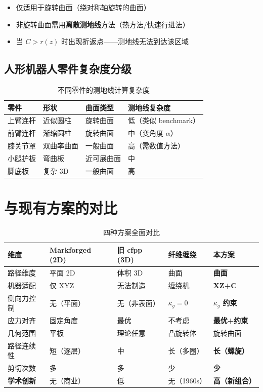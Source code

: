 \documentclass[11pt,a4paper]{article}
\begin{document}
\begin{itemize}[nosep]
\item 仅适用于旋转曲面（绕对称轴旋转的曲面）
\item 非旋转曲面需用\textbf{离散测地线}方法（热方法/快速行进法）
\item 当 $C > r(z)$ 时出现折返点——测地线无法到达该区域
\end{itemize}

\subsection{人形机器人零件复杂度分级}

\begin{table}[H]
\centering
\begin{tabularx}{\textwidth}{l l l X}
\toprule
\textbf{零件} & \textbf{形状} & \textbf{曲面类型} & \textbf{测地线复杂度} \\
\midrule
上臂连杆 & 近似圆柱 & 旋转曲面 & 低（类似 benchmark） \\
前臂连杆 & 渐缩圆柱 & 旋转曲面 & 中（变角度 $\alpha$） \\
膝关节罩 & 双曲率曲面 & 一般曲面 & 高（需数值方法） \\
小腿护板 & 弯曲板 & 近可展曲面 & 中 \\
脚底板 & 复杂 3D & 一般曲面 & 高 \\
\bottomrule
\end{tabularx}
\caption{不同零件的测地线计算复杂度}
\end{table}


\section{与现有方案的对比}

\begin{table}[H]
\centering
\small
\begin{tabularx}{\textwidth}{l X X X X}
\toprule
\textbf{维度} & \textbf{Markforged} (2D) & \textbf{旧 cfpp} (3D) & \textbf{纤维缠绕} & \textbf{本方案} \\
\midrule
路径维度 & 平面 2D & 体积 3D & 曲面 & \textcolor{pass}{\textbf{曲面}} \\
机器适配 & 仅 XYZ & 无法制造 & 缠绕机 & \textcolor{pass}{\textbf{XZ+C}} \\
侧向力控制 & 无（平面） & 无（非表面） & $\kappa_g=0$ & \textcolor{pass}{\textbf{$\kappa_g$ 约束}} \\
应力对齐 & 固定角度 & 最优 & 不考虑 & \textcolor{pass}{\textbf{最优+约束}} \\
几何范围 & 平板 & 理论任意 & 凸旋转体 & 旋转曲面 \\
路径连续性 & 短（逐层） & 中 & 长（多圈） & \textcolor{pass}{\textbf{长（螺旋）}} \\
剪切次数 & 多 & 多 & 少 & \textcolor{pass}{\textbf{少}} \\
\textbf{学术创新} & 无（商业） & 低 & 无（1960s） & \textcolor{accent}{\textbf{高（新组合）}} \\
\bottomrule
\end{tabularx}
\caption{四种方案全面对比}
\end{table}
\end{document}
